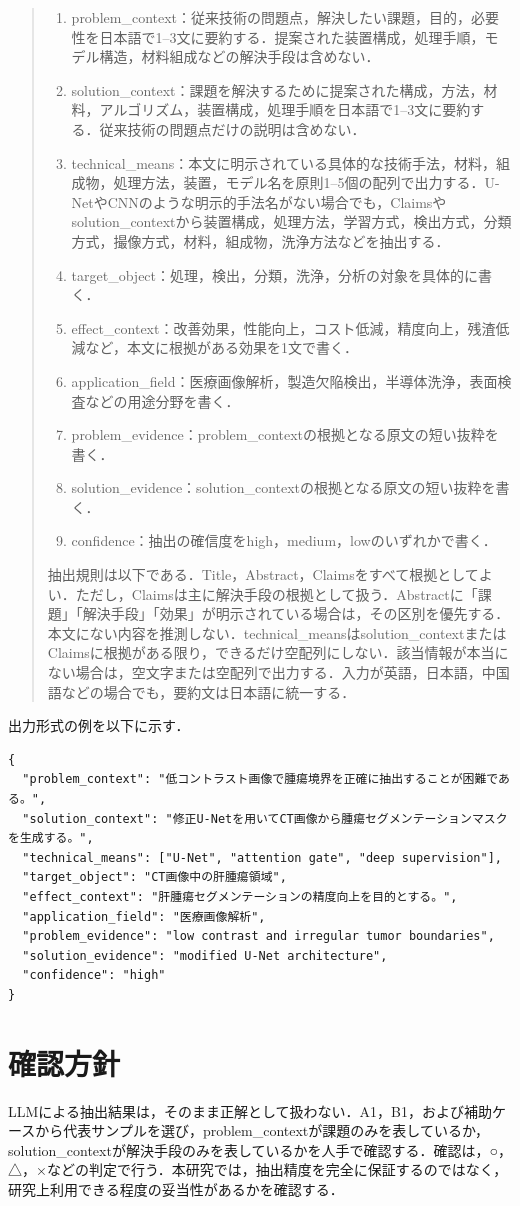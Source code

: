 \begin{quote}
\begin{enumerate}
  \item problem\_context：従来技術の問題点，解決したい課題，目的，必要性を日本語で1--3文に要約する．提案された装置構成，処理手順，モデル構造，材料組成などの解決手段は含めない．
  \item solution\_context：課題を解決するために提案された構成，方法，材料，アルゴリズム，装置構成，処理手順を日本語で1--3文に要約する．従来技術の問題点だけの説明は含めない．
  \item technical\_means：本文に明示されている具体的な技術手法，材料，組成物，処理方法，装置，モデル名を原則1--5個の配列で出力する．U-NetやCNNのような明示的手法名がない場合でも，Claimsやsolution\_contextから装置構成，処理方法，学習方式，検出方式，分類方式，撮像方式，材料，組成物，洗浄方法などを抽出する．
  \item target\_object：処理，検出，分類，洗浄，分析の対象を具体的に書く．
  \item effect\_context：改善効果，性能向上，コスト低減，精度向上，残渣低減など，本文に根拠がある効果を1文で書く．
  \item application\_field：医療画像解析，製造欠陥検出，半導体洗浄，表面検査などの用途分野を書く．
  \item problem\_evidence：problem\_contextの根拠となる原文の短い抜粋を書く．
  \item solution\_evidence：solution\_contextの根拠となる原文の短い抜粋を書く．
  \item confidence：抽出の確信度をhigh，medium，lowのいずれかで書く．
\end{enumerate}

抽出規則は以下である．Title，Abstract，Claimsをすべて根拠としてよい．ただし，Claimsは主に解決手段の根拠として扱う．Abstractに「課題」「解決手段」「効果」が明示されている場合は，その区別を優先する．本文にない内容を推測しない．technical\_meansはsolution\_contextまたはClaimsに根拠がある限り，できるだけ空配列にしない．該当情報が本当にない場合は，空文字または空配列で出力する．入力が英語，日本語，中国語などの場合でも，要約文は日本語に統一する．
\end{quote}

出力形式の例を以下に示す．

\begin{verbatim}
{
  "problem_context": "低コントラスト画像で腫瘍境界を正確に抽出することが困難である。",
  "solution_context": "修正U-Netを用いてCT画像から腫瘍セグメンテーションマスクを生成する。",
  "technical_means": ["U-Net", "attention gate", "deep supervision"],
  "target_object": "CT画像中の肝腫瘍領域",
  "effect_context": "肝腫瘍セグメンテーションの精度向上を目的とする。",
  "application_field": "医療画像解析",
  "problem_evidence": "low contrast and irregular tumor boundaries",
  "solution_evidence": "modified U-Net architecture",
  "confidence": "high"
}
\end{verbatim}

\section{確認方針}
LLMによる抽出結果は，そのまま正解として扱わない．A1，B1，および補助ケースから代表サンプルを選び，problem\_contextが課題のみを表しているか，solution\_contextが解決手段のみを表しているかを人手で確認する．確認は，○，△，×などの判定で行う．本研究では，抽出精度を完全に保証するのではなく，研究上利用できる程度の妥当性があるかを確認する．
